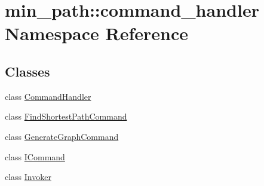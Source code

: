 \hypertarget{namespacemin__path_1_1command__handler}{}\section{min\+\_\+path\+:\+:command\+\_\+handler Namespace Reference}
\label{namespacemin__path_1_1command__handler}
\subsection*{Classes}
\begin{DoxyCompactItemize}
\item 
class \hyperlink{classmin__path_1_1command__handler_1_1_command_handler}{Command\+Handler}
\item 
class \hyperlink{classmin__path_1_1command__handler_1_1_find_shortest_path_command}{Find\+Shortest\+Path\+Command}
\item 
class \hyperlink{classmin__path_1_1command__handler_1_1_generate_graph_command}{Generate\+Graph\+Command}
\item 
class \hyperlink{classmin__path_1_1command__handler_1_1_i_command}{I\+Command}
\item 
class \hyperlink{classmin__path_1_1command__handler_1_1_invoker}{Invoker}
\end{DoxyCompactItemize}
